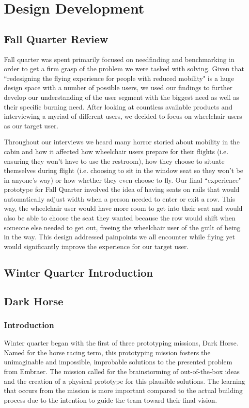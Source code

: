 \chapter{Design Development}

\section{Fall Quarter Review}
Fall quarter was spent primarily focused on needfinding and benchmarking in order to get a firm grasp of the problem we were tasked with solving. Given that ``redesigning the flying experience for people with reduced mobility" is a huge design space with a number of possible users, we used our findings to further develop our understanding of the user segment with the biggest need as well as their specific burning need. After looking at countless available products and interviewing a myriad of different users, we decided to focus on wheelchair users as our target user. 


Throughout our interviews we heard many horror storied about mobility in the cabin and how it affected how wheelchair users prepare for their flights (i.e. ensuring they won't have to use the restroom), how they choose to situate themselves during flight (i.e. choosing to sit in the window seat so they won't be in anyone's way) or how whether they even choose to fly. Our final ``experience" prototype for Fall Quarter involved the idea of having seats on rails that would automatically adjust width when a person needed to enter or exit a row. This way, the wheelchair user would have more room to get into their seat and would also be able to choose the seat they wanted because the row would shift when someone else needed to get out, freeing the wheelchair user of the guilt of being in the way. This design addressed painpoints we all encounter while flying yet would significantly improve the experience for our target user. 

\section{Winter Quarter Introduction}

\section{Dark Horse}
\subsection{Introduction}
Winter quarter began with the first of three prototyping missions, Dark Horse.  Named for the horse racing term, this prototyping mission fosters the unimaginable and impossible, improbable solutions to the presented problem from Embraer.  The mission called for the brainstorming of out-of-the-box ideas and the  creation of a physical prototype for this plausible solutions.  The learning that occurs from the mission is more important compared to the actual building process due to the intention to guide the team toward their final vision.

